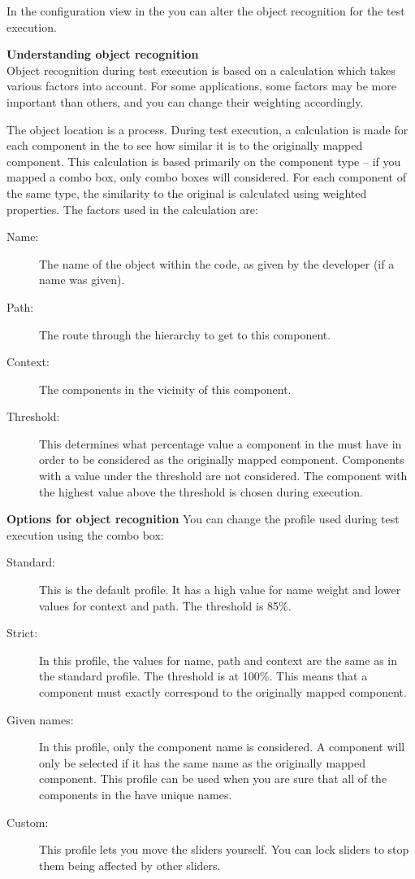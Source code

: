 \label{TasksOMConfiguration}

In the configuration view in the \gdomeditor{} you can alter the object recognition for the test execution. 


\textbf{Understanding object recognition}\\
Object recognition during test execution is based on a calculation which takes various factors into account. For some applications, some factors may be more important than others, and you can change their weighting accordingly. 

The object location is a  process. During test execution, a calculation is made for each component in the \gdaut{} to see how similar it is to the originally mapped component. This calculation is based primarily on the component type -- if you mapped a combo box, only combo boxes will considered. For each component of the same type, the similarity to the original is calculated using weighted properties. The factors used in the calculation are:

\begin{description}
\item [Name:]{The name of the object within the \gdaut{} code, as given by the developer (if a name was given). }
\item [Path:]{The route through the \gdaut{} hierarchy to get to this component.}
\item [Context:]{The components in the vicinity of this component.}
\item[Threshold:]{This determines what percentage value a component in the \gdaut{} must have in order to be considered as the originally mapped component. Components with a value under the threshold are not considered. The component with the highest value above the threshold is chosen during execution.}
\end{description}

\textbf{Options for object recognition}
You can change the profile used during test execution using the combo box:

\begin{description}
\item[Standard:]{This is the default profile. It has a high value for name weight and lower values for context and path. The threshold is 85\%.}
\item[Strict:]{In this profile, the values for name, path and context are the same as in the standard profile. The threshold is at 100\%. This means that a component must exactly correspond to the originally mapped component.}
\item[Given names:]{In this profile, only the component name is considered. A component will only be selected if it has the same name as the originally mapped component. This profile can be used when you are sure that all of the components in the \gdaut{} have unique names.}
\item[Custom:]{This profile lets you move the sliders yourself. You can lock sliders to stop them being affected by other sliders.}
\end{description}

